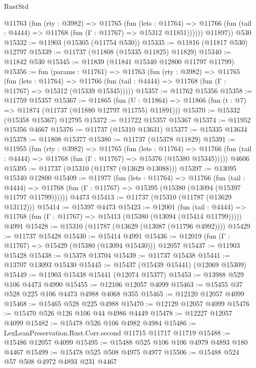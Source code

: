 \begin{lexlean}{RustStd}
\begin{coremodule}
          @11763
            (fun (rty : @3982) =>
            @11765
              (fun (lets : @11764) =>
              @11766 (fun (tail : @4444) => @11768 (fun (Γ : @11767) => @15312 @11851))))))
        @11897))
    @530
@15332 := @11903 (@15305 (@11754 @530))
@15335 := @11816 (@11817 @530) @12797
@15339 := @11737 (@11808 (@15335 @11825) @11829)
@15340 := @11842 @530
@15345 := @11839 (@11841 @15340 @12800 @11797 @11799)
@15356 := fun (params : @11761) =>
  @11763
    (fun (rty : @3982) =>
    @11765
      (fun (lets : @11764) =>
      @11766 (fun (tail : @4444) => @11768 (fun (Γ : @11767) => @15312 (@15339 @15345)))))
@15357 := @11762 @15356
@15358 := @11759 @15357
@15367 := @11865
    (fun (U : @11864) => @11866 (fun (t : @7) => @11874 (@11737 (@11880 @12797 @11755) @11891)))
@15370 := @15332 (@15358 @15367) @12795
@15372 := @11722 @15357 @15367
@15374 := @11952 @15356 @4667
@15376 := @11737 (@15310 @13631)
@15377 := @15335 @13634
@15378 := @11808 @15377
@15380 := @11737 (@15378 @11829)
@15391 := @11955
    (fun (rty : @3982) =>
    @11765
      (fun (lets : @11764) =>
      @11766 (fun (tail : @4444) => @11768 (fun (Γ : @11767) => @15376 (@15380 @15345)))))
    @4606
@15395 := @11737 (@15310 (@11787 (@13629 @13088)))
@15397 := @13095 @15340 @12800
@15409 := @11977
    (fun (lets : @11764) =>
    @11766
      (fun (tail : @4444) =>
      @11768 (fun (Γ : @11767) => @15395 (@15380 (@13094 (@15397 @11797 @11799))))))
    @4473
@15413 := @11737 (@15310 (@11787 (@13629 @13112)))
@15414 := @15397 @4473
@15423 := @12001
    (fun (tail : @4444) => @11768 (fun (Γ : @11767) => @15413 (@15380 (@13094 (@15414 @11799)))))
    @4991
@15428 := @15310 (@11787 (@13629 (@13087 (@11796 @4992))))
@15429 := @11737 @15428
@15430 := @15414 @4991
@15436 := @12019 (fun (Γ : @11767) => @15429 (@15380 (@13094 @15430))) @12057
@15437 := @11903 @15428
@15438 := @15378 @13704
@15439 := @11737 @15438
@15441 := @13707 @13093 @15430
@15445 := @15437 (@15439 @15441) (@12069 @15309)
@15449 := @11903 @15438 @15441 (@12074 @15377)
@15453 := @13988 @529 @106 @4473 @4990
@15455 := @12106 @12057 @4099
@15463 := @15455 @37 @528 @225 @106 @4473 @4988 @4068 @355
@15465 := @12120 @12057 @4099
@15468 := @15465 @528 @225 @4988
@15470 := @12129 @12057 @4099
@15476 := @15470 @526 @126 @106 @44 @4986 @4449
@15478 := @12227 @12057 @4099
@15482 := @15478 @526 @106 @4982 @4984
@15486 := LexLeanPreservation.Rust.Corr.second @11715 @11717 @11719
@15488 := @15486 @12057 @4099
@15495 := @15488 @525 @106 @106 @4979 @4893 @180 @4467
@15499 := @15478 @525 @508 @4975 @4977
@15506 := @15488 @524 @57 @508 @4972 @4893 @231 @4467

\end{coremodule}
\end{lexlean}
